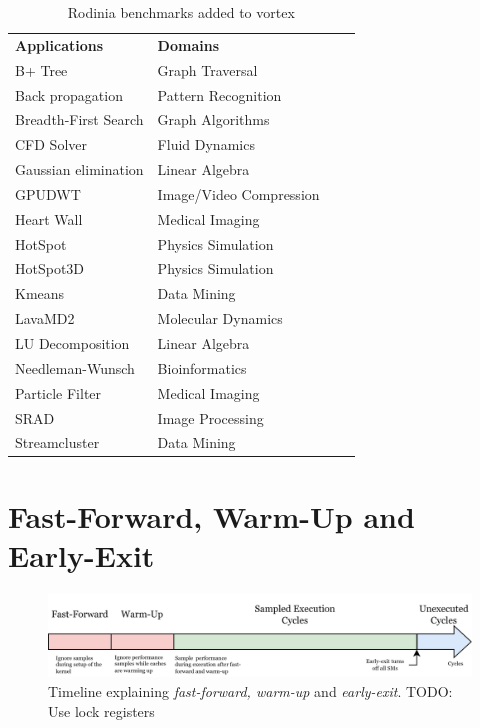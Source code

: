 \begin{table}
    \centering
    \caption{Rodinia benchmarks added to \Gls{vortex}}
    \begin{tabular}{|l|l|l|l|} 
        \hline
        \textbf{Applications}      & \textbf{Domains} \\ \hhline{|=|=|}
        B+ Tree                    & Graph Traversal \\ \hline
        Back propagation           & Pattern Recognition \\ \hline
        Breadth-First Search       & Graph Algorithms  \\ \hline
        CFD Solver                 & Fluid Dynamics  \\ \hline
        Gaussian elimination       & Linear Algebra \\ \hline
        GPUDWT                     & Image/Video Compression  \\ \hline
        Heart Wall                 & Medical Imaging \\ \hline
        HotSpot                    & Physics Simulation  \\ \hline
        HotSpot3D                  & Physics Simulation  \\ \hline
        Kmeans                     & Data Mining \\ \hline
        LavaMD2                    & Molecular Dynamics\\ \hline
        LU Decomposition           & Linear Algebra  \\ \hline
        Needleman-Wunsch           & Bioinformatics\\ \hline
        Particle Filter            & Medical Imaging \\ \hline
        SRAD                       & Image Processing  \\ \hline
        Streamcluster              & Data Mining \\ \hline
    \end{tabular}
    \label{tab:new_benchmarks}
\end{table}

\section{Fast-Forward, Warm-Up and Early-Exit}

\begin{figure}
    \centering
    \includegraphics[width=\textwidth]{figures/fast-forward-timeline.png}
    \caption{Timeline explaining \textit{fast-forward, warm-up} and \textit{early-exit}. TODO: Use lock registers}
    \label{fig:ff-timeline}
\end{figure}

